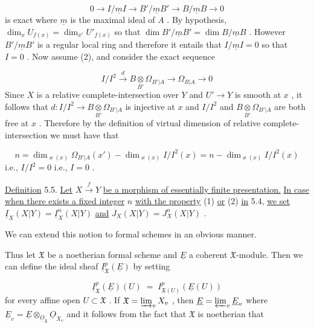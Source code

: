 \begin{equation*}
0 \to I/\underline{m}I \to B'/\underline{m}B' \to B/\underline{m}B \to 0
\end{equation*}
is exact where $\underline{m}$ is the maximal ideal of $A$ . By hypothesis, $\dim_{x}U_{f(x)} = \dim_{x'}U'_{f(x)}$ so that $\dim B'/\underline{m}B' = \dim B/\underline{m}B$ . However $B'/\underline{m}B'$ is a regular local ring and therefore it entails that $I/\underline{m}I = 0$ so that $I = 0$ . Now assume (2), and consider the exact sequence

\begin{equation*}
I/I^{2} \overset{d}{\to} B \underset{B'}{\otimes} \Omega_{B'|A} \to \Omega_{B|A} \to 0
\end{equation*}
Since $X$ is a relative complete-intersection over $Y$ and $U' \to Y$ is smooth at $x$ , it follows that $d : I/I^{2} \to B \underset{B'}{\otimes} \Omega_{B'|A}$ is injective at $x$ and $I/I^{2}$ and $B \underset{B'}{\otimes} \Omega_{B'|A}$ are both free at $x$ . Therefore by the definition of virtual dimension of relative complete-intersection we must have that

\begin{equation*}
n = \dim_{\varkappa(x)}\Omega_{B'|A}(x') - \dim_{\varkappa(x)}I/I^{2}(x) = n - \dim_{\varkappa(x)}I/I^{2}(x)
\end{equation*}
i.e., $I/I^{2} = 0$ i.e., $I = 0$ .

\underline{Definition} 5.5.   \underline{Let} $X \overset{f}{\to} Y$ \underline{be a morphism of essentially finite presentation.} \underline{In case when there exists a fixed integer} $n$ \underline{with the property} (1) \underline{or} (2) \underline{in} 5.4,
\underline{we set}  $\underline{I}_X(X|Y) = \underline{I}^n_X(X|Y)$  \underline{and}  $J_X(X|Y) = J^n_X(X|Y)$ .

We can extend this notion to formal schemes in an obvious manner.

Thus let $\mathfrak{X}$ be a noetherian formal scheme and $\underline{E}$ a coherent $\mathfrak{X}$-module. Then we can define the ideal sheaf $\underline{I}^p_{\mathfrak{X}}(\underline{E})$ by setting

\begin{equation*}
\underline{I}^p_{\mathfrak{X}}(\underline{E})(U) \;=\; I^p_{\mathfrak{X}(U)}(\underline{E}(U))
\end{equation*}
for every affine open $U \subset \mathfrak{X}$ . If $\mathfrak{X} = \varinjlim_{v} X_v$ , then $\underline{E} = \varprojlim_{v} \underline{E}_v$ where $\underline{E}_v = \underline{E} \otimes_{\underline{O}_{\mathfrak{X}}} \underline{O}_{X_v}$ and it follows from the fact that $\mathfrak{X}$ is noetherian that

